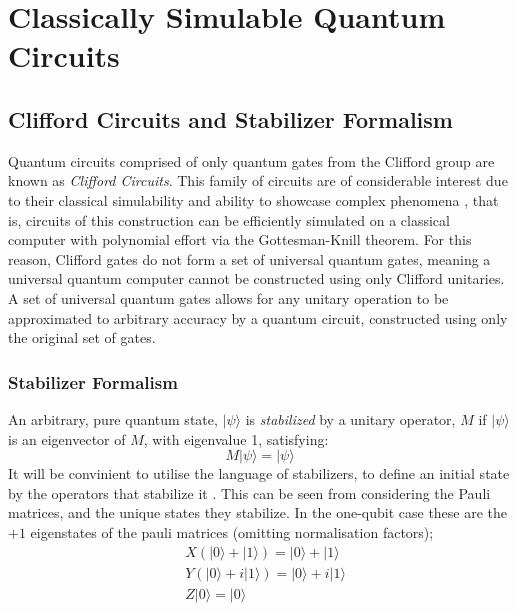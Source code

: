 \section{Classically Simulable Quantum Circuits}
\subsection{Clifford Circuits and Stabilizer Formalism}

Quantum circuits comprised of only quantum gates from the Clifford group are known as \textit{Clifford Circuits}.
This family of circuits are of considerable interest due to their classical simulability and ability to 
showcase complex phenomena \cite{doi:10.1063/5.0054863}, that is,
circuits of this construction can be efficiently simulated on a classical computer with polynomial
effort via the Gottesman-Knill theorem. For this reason, Clifford gates do not form
a set of universal quantum gates, meaning a universal quantum computer cannot be constructed using only
 Clifford unitaries. A set of universal quantum gates allows for any unitary operation to be approximated to
arbitrary accuracy by a quantum circuit, constructed using only the original set of gates.

\subsubsection{Stabilizer Formalism}
An arbitrary, pure quantum state, $|\psi\rangle$ is \textit{stabilized} by
a unitary operator, $M$ if $|\psi\rangle$  is an eigenvector of $M$, with eigenvalue 1, satisfying:
\begin{equation}
    M|\psi\rangle = |\psi\rangle
\end{equation}
It will be convinient to utilise the language of stabilizers, to define an initial state by the operators that stabilize it
\cite{PhysRevA.70.052328}.
This can be seen from considering the Pauli matrices, and the unique states they stabilize. In the one-qubit case these are
the $+1$ eigenstates of the pauli matrices (omitting normalisation factors);
\begin{align}
     & X(|0\rangle + |1\rangle) = |0\rangle + |1\rangle   \\
     & Y(|0\rangle + i|1\rangle) = |0\rangle + i|1\rangle \\
     & Z|0\rangle = |0\rangle
\end{align}

